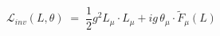 \begin{equation}\label{eq:defleuc}
{\mathcal L}_{inv}(L,\theta)\;=\; \frac{1}{2} g^2 L_{\mu}\cdot L_\mu
+ i g \,\theta_\mu \cdot {\tilde F}_\mu(L)
\end{equation}

